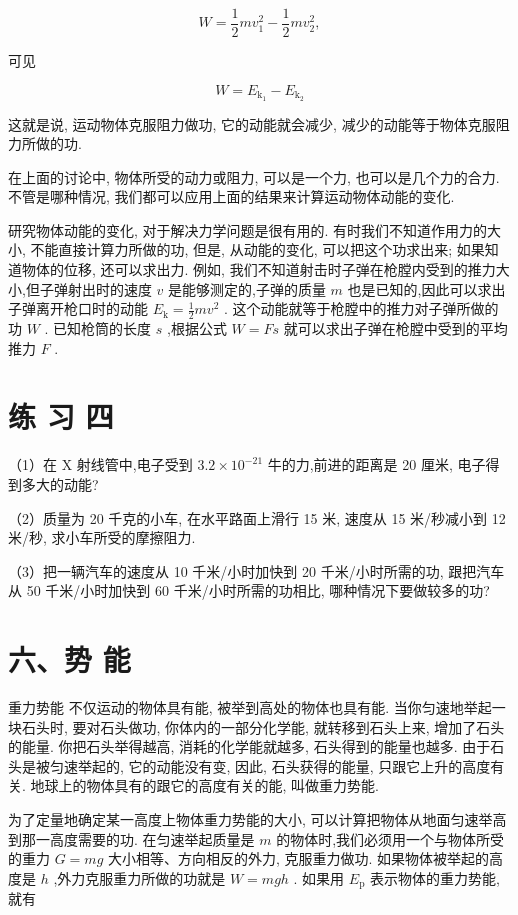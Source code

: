 \documentclass[10pt]{article}
\begin{document}
\[
W = \frac{1}{2}m{v}_{1}^{2} - \frac{1}{2}m{v}_{2}^{2},
\]

可见

\[
W = {E}_{{\mathrm{k}}_{1}} - {E}_{{\mathrm{k}}_{2}}
\]

这就是说, 运动物体克服阻力做功, 它的动能就会减少, 减少的动能等于物体克服阻力所做的功.

在上面的讨论中, 物体所受的动力或阻力, 可以是一个力, 也可以是几个力的合力. 不管是哪种情况, 我们都可以应用上面的结果来计算运动物体动能的变化.

研究物体动能的变化, 对于解决力学问题是很有用的. 有时我们不知道作用力的大小, 不能直接计算力所做的功, 但是, 从动能的变化, 可以把这个功求出来; 如果知道物体的位移, 还可以求出力. 例如, 我们不知道射击时子弹在枪膛内受到的推力大小,但子弹射出时的速度 \(v\) 是能够测定的,子弹的质量 \(m\) 也是已知的,因此可以求出子弹离开枪口时的动能 \({E}_{\mathrm{k}} = \frac{1}{2}m{v}^{2}\) . 这个动能就等于枪膛中的推力对子弹所做的功 \(W\) . 已知枪筒的长度 \(s\) ,根据公式 \(W = {Fs}\) 就可以求出子弹在枪膛中受到的平均推力 \(F\) .

\section*{练 习 四}

（1）在 \(\mathrm{X}\) 射线管中,电子受到 \({3.2} \times {10}^{-{21}}\) 牛的力,前进的距离是 20 厘米, 电子得到多大的动能?

（2）质量为 20 千克的小车, 在水平路面上滑行 15 米, 速度从 15 米/秒减小到 12 米/秒, 求小车所受的摩擦阻力.

（3）把一辆汽车的速度从 10 千米/小时加快到 20 千米/小时所需的功, 跟把汽车从 50 千米/小时加快到 60 千米/小时所需的功相比, 哪种情况下要做较多的功?

\section*{六、势 能}

重力势能 不仅运动的物体具有能, 被举到高处的物体也具有能. 当你匀速地举起一块石头时, 要对石头做功, 你体内的一部分化学能, 就转移到石头上来, 增加了石头的能量. 你把石头举得越高, 消耗的化学能就越多, 石头得到的能量也越多. 由于石头是被匀速举起的, 它的动能没有变, 因此, 石头获得的能量, 只跟它上升的高度有关. 地球上的物体具有的跟它的高度有关的能, 叫做重力势能.

为了定量地确定某一高度上物体重力势能的大小, 可以计算把物体从地面匀速举高到那一高度需要的功. 在匀速举起质量是 \(m\) 的物体时,我们必须用一个与物体所受的重力 \(G = {mg}\) 大小相等、方向相反的外力, 克服重力做功. 如果物体被举起的高度是 \(h\) ,外力克服重力所做的功就是 \(W = {mgh}\) . 如果用 \({E}_{\mathrm{p}}\) 表示物体的重力势能, 就有
\end{document}

